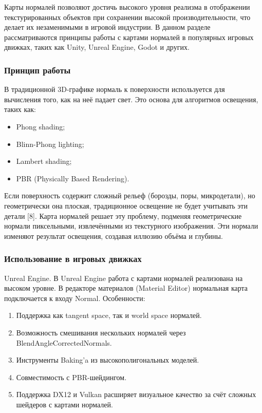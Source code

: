Карты нормалей позволяют достичь высокого уровня реализма в отображении текстурированных объектов при сохранении высокой производительности, что делает их незаменимыми в игровой индустрии. В данном разделе рассматриваются принципы работы с картами нормалей в популярных игровых движках, таких как Unity, Unreal Engine, Godot и других.
\subsubsection{Принцип работы}

В традиционной 3D-графике нормаль к поверхности используется для вычисления того, как на неё падает свет. Это основа для алгоритмов освещения, таких как:
\begin{itemize}
	\item Phong shading;
	\item Blinn-Phong lighting;
	\item Lambert shading;
	\item PBR (Physically Based Rendering).
\end{itemize}

Если поверхность содержит сложный рельеф (борозды, поры, микродетали), но геометрически она плоская, традиционное освещение не будет учитывать эти детали [8]. Карта нормалей решает эту проблему, подменяя геометрические нормали пиксельными, извлечёнными из текстурного изображения. Эти нормали изменяют результат освещения, создавая иллюзию объёма и глубины.
\subsubsection{Использование в игровых движках}

Unreal Engine. В Unreal Engine работа с картами нормалей реализована на высоком уровне. В редакторе материалов (Material Editor) нормальная карта подключается к входу Normal. Особенности:
\begin{enumerate}
	\item Поддержка как tangent space, так и world space нормалей.
	\item Возможность смешивания нескольких нормалей через BlendAngleCorrectedNormals.
	\item Инструменты Baking'a из высокополигональных моделей.
	\item Совместимость с PBR-шейдингом.
	\item Поддержка DX12 и Vulkan расширяет визуальное качество за счёт сложных шейдеров с картами нормалей.
\end{enumerate}
